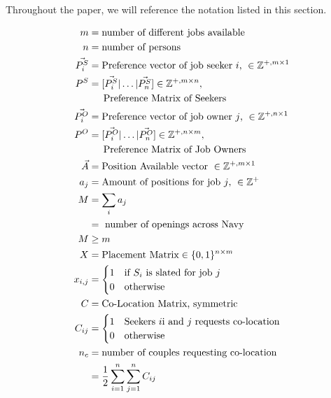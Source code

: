 Throughout the paper, we will reference the notation listed in this section.

\begin{align*}
m &= \text{number of different jobs available}\\
n &= \text{number of persons}\\
\vec{P^S_i} &= \text{Preference vector of job seeker $i$, } \in \mathbb{Z}^{+, m \times 1} \\
P^S &= [\vec{P^S_i} | \dots | \vec{P^S_n}] \in \mathbb{Z}^{+, m \times n}, \\ 
&\text{\indent Preference Matrix of Seekers} \\
\vec{P^O_i} &= \text{Preference vector of job owner $j$, } \in \mathbb{Z}^{+, n \times 1} \\
P^O &= [\vec{P^O_i} | \dots | \vec{P^O_n}] \in \mathbb{Z}^{+, n \times m}, \\ 
&\text{\indent Preference Matrix of Job Owners} \\
\vec{A} &= \text{Position Available vector }\in \mathbb{Z}^{+, m \times 1} \\
a_j &= \text{Amount of positions for job $j$, } \in \mathbb{Z}^{+} \\
M &= \sum_i a_j \\
&= \text{ number of openings across Navy}\\
M & \geq m \\
X &= \text{Placement Matrix} \in \{0,1\}^{n \times m} \\
x_{i,j} &= \begin{cases}
1 & \text{if $S_i$ is slated for job $j$}\\
0 & \text{otherwise}
\end{cases} \\
C &= \text{Co-Location Matrix, symmetric}\\
C_{ij} &= \begin{cases}
1 & \text{Seekers $i$i and $j$ requests co-location} \\
0 & \text{otherwise}
\end{cases} \\
n_c &= \text{number of couples requesting co-location}\\
&= \frac{1}{2}\sum_{i=1}^n\sum_{j=1}^n C_{ij}
\end{align*}


